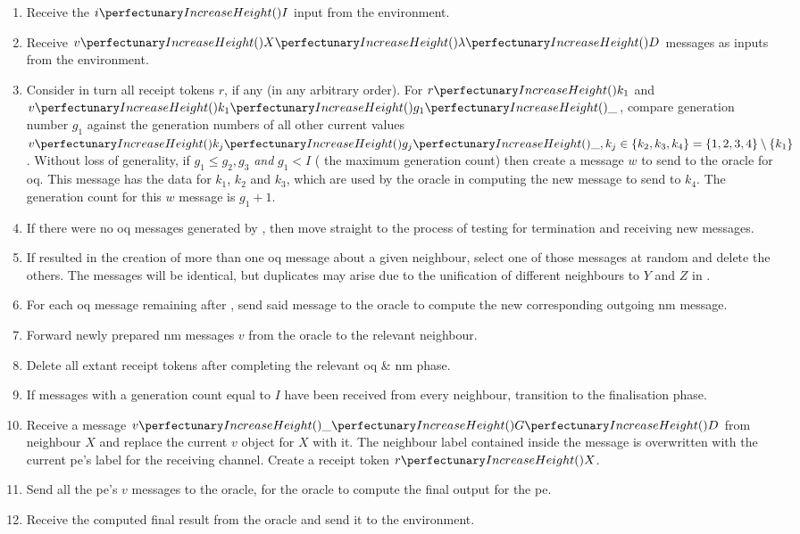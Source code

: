 \begin{enumerate}
    \item Receive the \(\cpfunc{i}{I}\) input from the environment.
    \item Receive \(\cpvv{X}{\cpempty}{D}\) messages as inputs from the environment.
    \item Consider in turn all receipt tokens \(r\), if any (in any arbitrary order). For \(\cpfunc{r}{k_1}\) and \(\cpvv{k_1}{g_1}{\cpdiscard}\), compare generation number \(g_1\) against the generation numbers of all other current values \(\cpvv{k_j}{g_j}{\cpdiscard}, k_j \in \{k_2, k_3, k_4\} = \{1, 2, 3, 4\} \setminus \{k_1\}\). Without loss of generality, if \(g_1 \leq g_2, g_3\) \emph{and} \(g_1 < I\) (\ie{} the maximum generation count) then create a message \(w\) to send to the oracle for \gls{oq}.  This message has the data for \(k_1\), \(k_2\) and \(k_3\), which are used by the oracle in computing the new message to send to \(k_4\).  The generation count for this \(w\) message is \(g_1 + 1\).
    \item If there were no \gls{oq} messages generated by , then move straight to the process of testing for termination and receiving new messages.
    \item If  resulted in the creation of more than one \gls{oq} message about a given neighbour, select one of those messages at random and delete the others.  The messages will be identical, but duplicates may arise due to the unification of different neighbours to \(Y\) and \(Z\) in .
    \item For each \gls{oq} message remaining after , send said message to the oracle to compute the new corresponding outgoing \gls{nm} message.
    \item Forward newly prepared \gls{nm} messages \(v\) from the oracle to the relevant neighbour.
    \item Delete all extant receipt tokens after completing the relevant \gls{oq} \& \gls{nm} phase.
    \item If messages with a generation count equal to \(I\) have been received from every neighbour, transition to the finalisation phase.
    \item Receive a message \(\cpvv{\cpdiscard}{G}{D}\) from neighbour \(X\) and replace the current \(v\) object for \(X\) with it.  The neighbour label contained inside the message is overwritten with the current \gls{pe}'s label for the receiving channel.  Create a receipt token \(\cpfunc{r}{X}\).
    \item Send all the \gls{pe}'s \(v\) messages to the oracle, for the oracle to compute the final output for the \gls{pe}.
    \item Receive the computed final result from the oracle and send it to the environment.
\end{enumerate}


